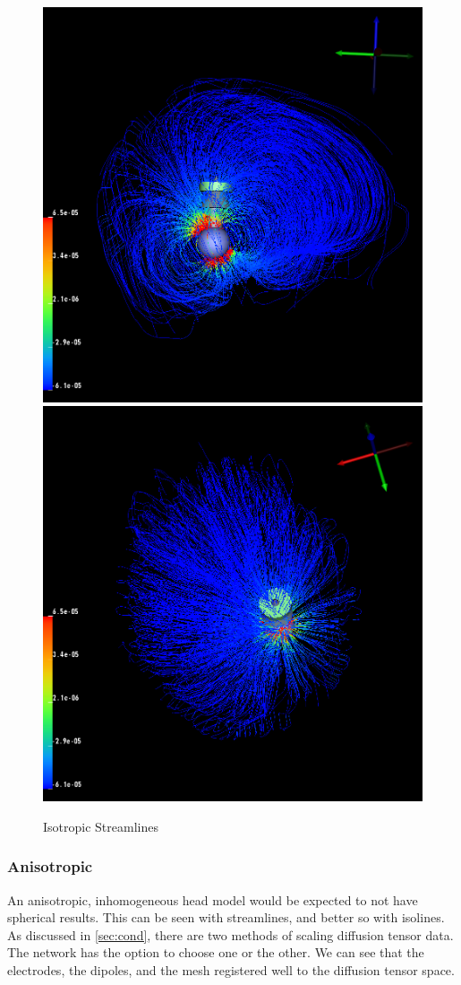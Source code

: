 \begin{figure}[H]
\begin{center}
\includegraphics[width=.49\textwidth]{Figures/iso_streamlines}
\includegraphics[width=.49\textwidth]{Figures/iso_streamlines_top}
\caption{Isotropic Streamlines}
\label{fig:isostream}
\end{center}
\end{figure}

\subsubsection{Anisotropic}

An anisotropic, inhomogeneous head model would be expected to not have spherical results. This can be seen with streamlines, and better so with isolines. As discussed in \ref{sec:cond}, there are two methods of scaling diffusion tensor data. The network has the option to choose one or the other. We can see that the electrodes, the dipoles, and the mesh registered well to the diffusion tensor space.

